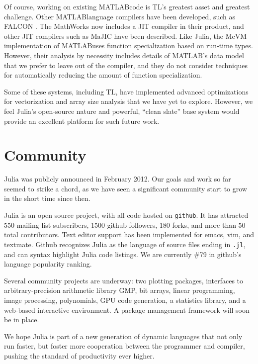 \documentclass[9pt]{sigplanconf}
\newcommand{\Matlab}{MATLAB\textsuperscript{\tiny\textregistered}}
\begin{document}
Of course, working on existing \Matlab code is TL's greatest
asset and greatest challenge. Other \Matlab language compilers
have been developed, such as FALCON \cite{falcon}. The MathWorks now
includes a JIT compiler in their product, and other JIT compilers such
as MaJIC \cite{majic} have been described.
Like Julia, the McVM \cite{matlabspecializer} implementation of
\Matlab uses function specialization based on run-time types.
However, their analysis by necessity includes details of
\Matlab's data model that we prefer to leave out of the
compiler, and they do not consider techniques
for automatically reducing the amount of function specialization.

Some of these systems, including TL,
have implemented advanced optimizations
for vectorization \cite{telescopingvectorization} and array size analysis
\cite{slicehoisting} that we have yet to explore. However, we feel Julia's
open-source nature and powerful, ``clean slate'' base system would provide
an excellent platform for such future work.


\section{Community}

Julia was publicly announced in February 2012. Our goals and work so
far seemed to strike a chord, as we have seen a significant community
start to grow in the short time since then.

Julia is an open source project, with all code hosted on {\tt github}.
It has attracted 550 mailing list subscribers, 1500 github followers,
180 forks, and more than 50 total contributors. Text editor support
has been implemented for emacs, vim, and textmate.
Github recognizes Julia as the language of source files ending in
{\tt .jl}, and can syntax highlight Julia code listings.
We are currently \#79 in github's language popularity ranking.

Several community projects are underway: two plotting packages,
interfaces to arbitrary-precision arithmetic library GMP,
bit arrays, linear programming, image processing, polynomials,
GPU code generation, a statistics library, and a web-based interactive
environment. A package management framework will soon be in place.

We hope Julia is part of a new generation of dynamic languages that not
only run faster, but foster more cooperation between the programmer
and compiler, pushing the standard of productivity ever higher.
\end{document}
